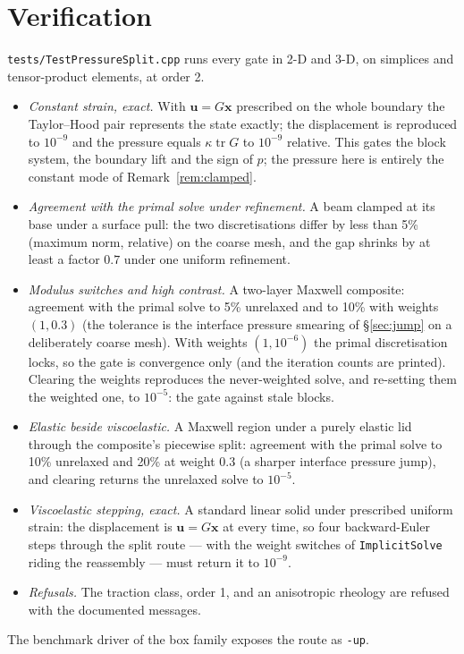 \documentclass[11pt]{article}
\numberwithin{equation}{section}
\theoremstyle{remark}
\newcommand{\tr}{\operatorname{tr}}
\newcommand{\vu}{\mathbf{u}}
\newcommand{\vx}{\mathbf{x}}
\newcommand{\code}[1]{\texttt{#1}}
\begin{document}
\section{Verification}
\label{sec:verification}

\code{tests/TestPressureSplit.cpp} runs every gate in 2-D and 3-D, on
simplices and tensor-product elements, at order 2.
\begin{itemize}
\item \emph{Constant strain, exact.} With $\vu = G\vx$ prescribed on the
  whole boundary the Taylor--Hood pair represents the state exactly; the
  displacement is reproduced to $10^{-9}$ and the pressure equals
  $\kappa\tr G$ to $10^{-9}$ relative. This gates the block system, the
  boundary lift and the sign of $p$; the pressure here is entirely the
  constant mode of Remark~\ref{rem:clamped}.
\item \emph{Agreement with the primal solve under refinement.} A beam
  clamped at its base under a surface pull: the two discretisations differ
  by less than 5\% (maximum norm, relative) on the coarse mesh, and the
  gap shrinks by at least a factor $0.7$ under one uniform refinement.
\item \emph{Modulus switches and high contrast.} A two-layer Maxwell
  composite: agreement with the primal solve to 5\% unrelaxed and to 10\%
  with weights $(1,0.3)$ (the tolerance is the interface pressure smearing
  of \S\ref{sec:jump} on a deliberately coarse mesh). With weights
  $(1,10^{-6})$ the primal discretisation locks, so the gate is
  convergence only (and the iteration counts are printed). Clearing the
  weights reproduces the never-weighted solve, and re-setting them the
  weighted one, to $10^{-5}$: the gate against stale blocks.
\item \emph{Elastic beside viscoelastic.} A Maxwell region under a purely
  elastic lid through the composite's piecewise split: agreement with the
  primal solve to 10\% unrelaxed and 20\% at weight $0.3$ (a sharper
  interface pressure jump), and clearing returns the unrelaxed solve to
  $10^{-5}$.
\item \emph{Viscoelastic stepping, exact.} A standard linear solid under
  prescribed uniform strain: the displacement is $\vu = G\vx$ at every
  time, so four backward-Euler steps through the split route --- with the
  weight switches of \code{ImplicitSolve} riding the reassembly --- must
  return it to $10^{-9}$.
\item \emph{Refusals.} The traction class, order 1, and an anisotropic
  rheology are refused with the documented messages.
\end{itemize}
The benchmark driver of the box family exposes the route as \code{-up}.
\end{document}
